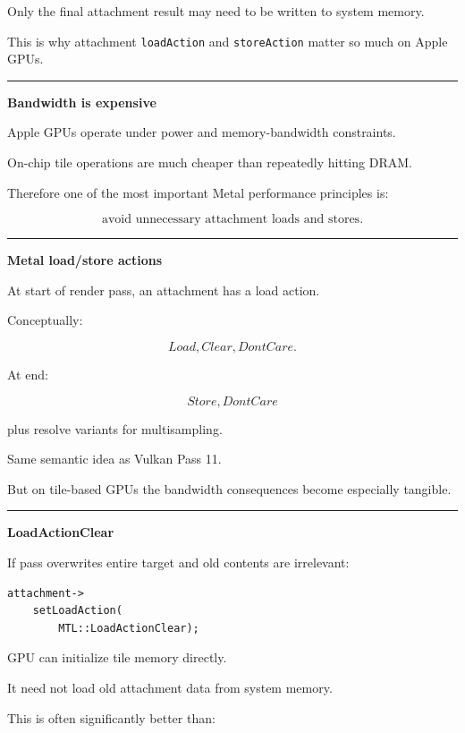 Only the final attachment result may need to be written to system memory.

This is why attachment \texttt{loadAction} and \texttt{storeAction} matter so much on Apple GPUs.

\begin{center}\rule{0.5\linewidth}{0.5pt}\end{center}

\textbf{Bandwidth is expensive}

Apple GPUs operate under power and memory-bandwidth constraints.

On-chip tile operations are much cheaper than repeatedly hitting DRAM.

Therefore one of the most important Metal performance principles is:

\[
\boxed{
\text{avoid unnecessary attachment loads and stores}.
}
\]

\begin{center}\rule{0.5\linewidth}{0.5pt}\end{center}

\textbf{Metal load/store actions}

At start of render pass, an attachment has a load action.

Conceptually:

\[
Load,
Clear,
DontCare.
\]

At end:

\[
Store,
DontCare
\]

plus resolve variants for multisampling.

Same semantic idea as Vulkan Pass 11.

But on tile-based GPUs the bandwidth consequences become especially tangible.

\begin{center}\rule{0.5\linewidth}{0.5pt}\end{center}

\textbf{LoadActionClear}

If pass overwrites entire target and old contents are irrelevant:

\begin{verbatim}
attachment->
    setLoadAction(
        MTL::LoadActionClear);
\end{verbatim}

GPU can initialize tile memory directly.

It need not load old attachment data from system memory.

This is often significantly better than:

